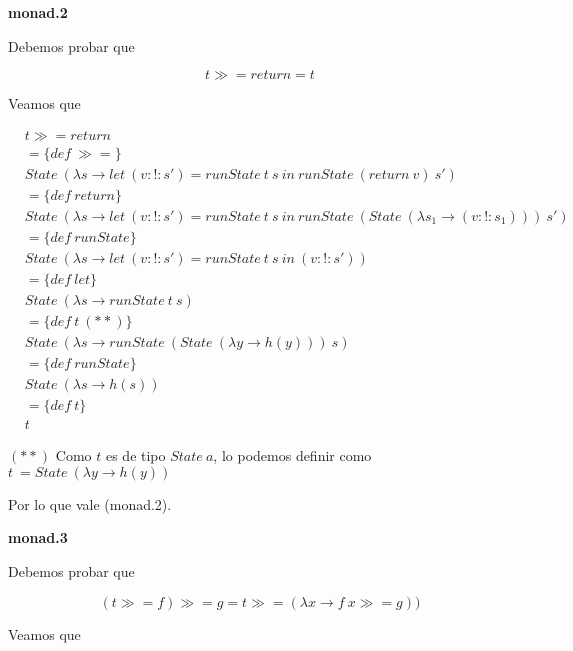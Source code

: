 \documentclass[11pt]{article}
\begin{document}
\textbf{monad.2}

Debemos probar que

$$t \mathrel{\gg \! \! =} return = t$$

Veamos que 
\vspace{2mm}

\begin{align*}
    &t \mathrel{\gg \! \! =} return\\
    &= \{def\ \mathrel{\gg \! \! =}\} \\
    &State\ (\lambda s \to let\ (v :\mathrel{!}: s') = runState\ t\ s\ in\ runState\ (return\ v)\ s')\\
    &=\{def\ return\} \\
    &State\ (\lambda s \to let\ (v :\mathrel{!}: s') = runState\ t\ s\ in\ runState\ (State\ (\lambda s_1 \to (v :\mathrel{!}: s_1)))\ s') \\
    &=\{def\ runState\} \\
    &State\ (\lambda s \to let\ (v :\mathrel{!}: s') = runState\ t\ s\ in\ (v :\mathrel{!}: s')) \\
    &= \{def\ let\}\\
    &State\ (\lambda s \to runState\ t\ s) \\
    &= \{def\ t\ (**)\}\\
    &State\ (\lambda s \to runState\ (State\ (\lambda y \to h(y)))\ s) \\
    &= \{def\ runState\} \\
    &State\ (\lambda s \to h(s)) \\
    &= \{def\ t\} \\
    &t 
\end{align*}
\vspace{2mm}

$(**)$ Como $t$ es de tipo $State\ a$, lo podemos definir como $t\ = State\ (\lambda y \to h(y))$

\vspace{2mm}

Por lo que vale (monad.2).
\vspace{12cm}

\textbf{monad.3}

Debemos probar que 

$$(t \mathrel{\gg \! \! =} f) \mathrel{\gg \! \! =} g = t \mathrel{\gg \! \! =} (\lambda x \to f\ x \mathrel{\gg \! \! =} g))$$

Veamos que 
\vspace{2mm}
\end{document}
